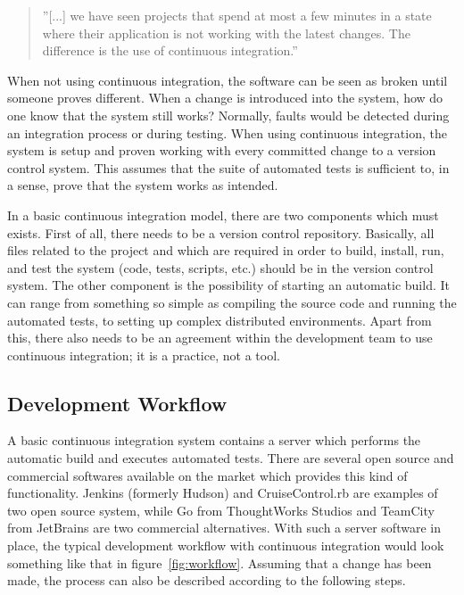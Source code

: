 \documentclass[a4paper,english,12pt]{report}
\begin{document}
\begin{quote}
  ''[...] we have seen projects that spend at most a few minutes in a state where their application is not working with the latest changes. The difference is the use of continuous integration.''
\end{quote}

When not using continuous integration, the software can be seen as broken until someone proves different. When a change is introduced into the system, how do one know that the system still works? Normally, faults would be detected during an integration process or during testing. When using continuous integration, the system is setup and proven working with every committed change to a version control system. This assumes that the suite of automated tests is sufficient to, in a sense, prove that the system works as intended. \citep[p. 56]{humble2010continuous}

In a basic continuous integration model, there are two components which must exists. First of all, there needs to be a version control repository. Basically, all files related to the project and which are required in order to build, install, run, and test the system (code, tests, scripts, etc.) should be in the version control system. The other component is the possibility of starting an automatic build. It can range from something so simple as compiling the source code and running the automated tests, to setting up complex distributed environments. Apart from this, there also needs to be an agreement within the development team to use continuous integration; it is a practice, not a tool. \citep[pp. 56-57]{humble2010continuous}

\subsection{Development Workflow}
A basic continuous integration system contains a server which performs the automatic build and executes automated tests. There are several open source and commercial softwares available on the market which provides this kind of functionality. Jenkins (formerly Hudson) and CruiseControl.rb are examples of two open source system, while Go from ThoughtWorks Studios and TeamCity from JetBrains are two commercial alternatives. With such a server software in place, the typical development workflow with continuous integration would look something like that in figure~\vref{fig:workflow}. Assuming that a change has been made, the process can also be described according to the following steps. \citep[pp. 58-59]{humble2010continuous}
\end{document}
